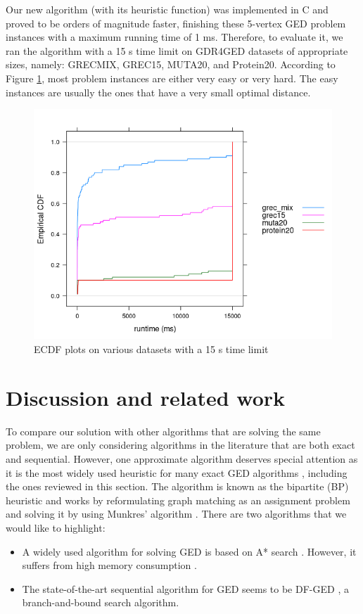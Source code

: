 \documentclass{article}
\theoremstyle{definition}
\begin{document}
Our new algorithm (with its heuristic function) was implemented in C and proved to be orders of magnitude faster, finishing these 5-vertex GED problem instances with a maximum running time of 1 ms. Therefore, to evaluate it, we ran the algorithm with a 15 s time limit on GDR4GED datasets of appropriate sizes, namely: GRECMIX, GREC15, MUTA20, and Protein20. According to Figure \ref{fig:ecdf}, most problem instances are either very easy or very hard. The easy instances are usually the ones that have a very small optimal distance.
\begin{figure}
  \includegraphics[scale=0.75]{ecdfs.png}
  \caption{ECDF plots on various datasets with a 15 s time limit}
  \label{fig:ecdf}
\end{figure}
\section{Discussion and related work}
To compare our solution with other algorithms that are solving the same problem, we are only considering algorithms in the literature that are both exact and sequential. However, one approximate algorithm deserves special attention as it is the most widely used heuristic for many exact GED algorithms \cite{DBLP:conf/icpram/Abu-AishehRRM15}, including the ones reviewed in this section. The algorithm is known as the bipartite (BP) heuristic and works by reformulating graph matching as an assignment problem and solving it by using Munkres' algorithm \cite{DBLP:journals/ivc/RiesenB09}. There are two algorithms that we would like to highlight:
\begin{itemize}
\item A widely used algorithm for solving GED is based on A* search \cite{DBLP:conf/gbrpr/FankhauserRB11}. However, it suffers from high memory consumption \cite{DBLP:conf/icpram/Abu-AishehRRM15}.
\item The state-of-the-art sequential algorithm for GED seems to be DF-GED \cite{DBLP:conf/icpram/Abu-AishehRRM15}, a branch-and-bound search algorithm.
\end{itemize}
\end{document}
